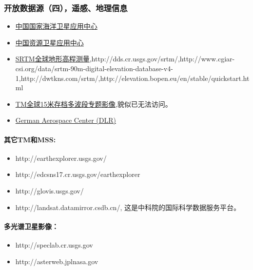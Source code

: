 \documentclass[letterpaper,10pt,english]{sphinxmanual}
\begin{document}
\subsubsection{开放数据源（四），遥感、地理信息}
\label{opendatasource:}\label{opendatasource:id14}\begin{itemize}
\item {} 
\href{http://www.nsoas.gov.cn/zx/channel/dmyy\_01.asp}{中国国家海洋卫星应用中心}

\item {} 
\href{http://219.143.215.3/home.jsp}{中国资源卫星应用中心}

\item {} 
\href{http://www2.jpl.nasa.gov/srtm}{SRTM全球地形高程测量},http://dds.cr.usgs.gov/srtm/,http://www.cgiar-csi.org/data/srtm-90m-digital-elevation-database-v4-1,http://dwtkns.com/srtm/,http://elevation.bopen.eu/en/stable/quickstart.html

\item {} 
\href{http://glcfapp.umiacs.umd.edu:8080/esdi/index.jsp}{TM全球15米存档多波段专题影像},貌似已无法访问。

\item {} 
\href{http://www.dlr.de/eoc/en/desktopdefault.aspx/tabid-8799/}{German Aerospace Center (DLR)}

\end{itemize}


\paragraph{其它TM和MSS:}
\label{opendatasource:tmmss}\begin{itemize}
\item {} 
http://earthexplorer.usgs.gov/

\item {} 
http://edcsns17.cr.usgs.gov/earthexplorer

\item {} 
http://glovis.usgs.gov/

\item {} 
http://landsat.datamirror.csdb.cn/, 这是中科院的国际科学数据服务平台。

\end{itemize}


\paragraph{多光谱卫星影像：}
\label{opendatasource:}\label{opendatasource:id15}\begin{itemize}
\item {} 
http://speclab.cr.usgs.gov

\item {} 
http://asterweb.jplnasa.gov

\end{itemize}
\end{document}
